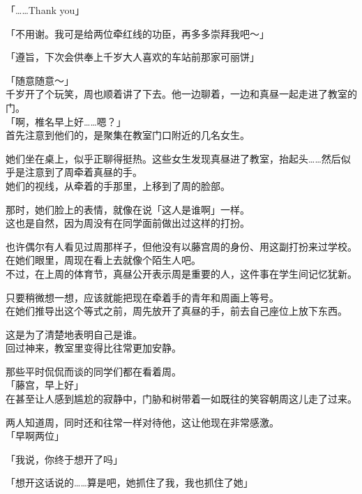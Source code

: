 「……Thank you」

「不用谢。我可是给两位牵红线的功臣，再多多崇拜我吧～」

「遵旨，下次会供奉上千岁大人喜欢的车站前那家可丽饼」

「随意随意～」\\

千岁开了个玩笑，周也顺着讲了下去。他一边聊着，一边和真昼一起走进了教室的门。\\

「啊，椎名早上好……嗯？」\\

首先注意到他们的，是聚集在教室门口附近的几名女生。

她们坐在桌上，似乎正聊得挺热。这些女生发现真昼进了教室，抬起头……然后似乎是注意到了周牵着真昼的手。\\

她们的视线，从牵着的手那里，上移到了周的脸部。

那时，她们脸上的表情，就像在说「这人是谁啊」一样。\\

这也是自然，因为周没有在同学面前做出过这样的打扮。

也许偶尔有人看见过周那样子，但他没有以藤宫周的身份、用这副打扮来过学校。在她们眼里，周现在看上去就像个陌生人吧。\\

不过，在上周的体育节，真昼公开表示周是重要的人，这件事在学生间记忆犹新。

只要稍微想一想，应该就能把现在牵着手的青年和周画上等号。\\

在她们推导出这个等式之前，周先放开了真昼的手，前去自己座位上放下东西。

这是为了清楚地表明自己是谁。\\

回过神来，教室里变得比往常更加安静。

那些平时侃侃而谈的同学们都在看着周。\\

「藤宫，早上好」\\

在甚至让人感到尴尬的寂静中，门胁和树带着一如既往的笑容朝周这儿走了过来。

两人知道周，同时还和往常一样对待他，这让他现在非常感激。\\

「早啊两位」

「我说，你终于想开了吗」

「想开这话说的……算是吧，她抓住了我，我也抓住了她」\\

